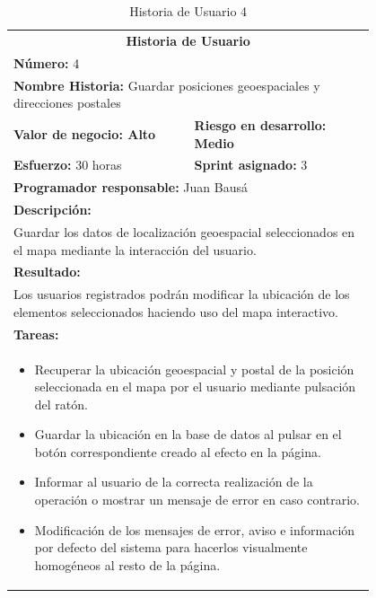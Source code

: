 	\begin{table}[H]
	  \centering 
	 	\begin{tabular}{p{0.4\linewidth}p{0.4\linewidth}}
	    \toprule
	    \multicolumn{2}{c}{\cellcolor{black!30}\textbf{Historia de Usuario}} 													\\
		\multicolumn{2}{l}{\cellcolor{gray!25}\textbf{Número: }4}																\\
		\multicolumn{2}{l}{\textbf{Nombre Historia: } Guardar posiciones geoespaciales y direcciones postales}				\\
		\cellcolor{gray!25}\textbf{Valor de negocio: Alto}	&	\cellcolor{gray!25}\textbf{Riesgo en desarrollo: Medio}		\\
		\textbf{Esfuerzo:} 30 horas				&	\textbf{Sprint asignado: }3 												\\
		\multicolumn{2}{l}{\cellcolor{gray!25}\textbf{Programador responsable: }Juan Bausá}									\\
		\multicolumn{2}{l}{\textbf{Descripción:}}                                                     						\\
		\multicolumn{2}{l}{\parbox{15cm}{Guardar los datos de localización geoespacial seleccionados en el mapa mediante la interacción del usuario.}}				\\
		\multicolumn{2}{l}{\cellcolor{gray!25}\textbf{Resultado:}}																\\		
		\multicolumn{2}{l}{\parbox{15cm}{Los usuarios registrados podrán modificar la ubicación de los elementos seleccionados haciendo uso del mapa interactivo.}}																									\\
		\multicolumn{2}{l}{\textbf{Tareas:}}																					\\
		\multicolumn{2}{l}{
			\begin{minipage}{12cm}
	    		\vskip 4pt
	    		\begin{itemize}
	    			\item Recuperar la ubicación geoespacial y postal de la posición seleccionada en el mapa por el usuario mediante pulsación del ratón.
	    			\item Guardar la ubicación en la base de datos al pulsar en el botón correspondiente creado al efecto en la página.
	    			\item Informar al usuario de la correcta realización de la operación o mostrar un mensaje de error en caso contrario.
	    			\item Modificación de los mensajes de error, aviso e información por defecto del sistema para hacerlos visualmente homogéneos al resto de la página.
				\end{itemize}
			  	\vskip 4pt
		 	\end{minipage}
		} \\																				
	    \hline
	  \end{tabular}
	  \caption{Historia de Usuario 4}
	\end{table}
	

